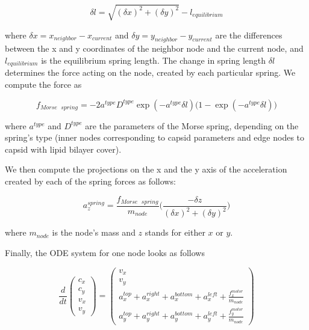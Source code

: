 \begin{equation}
\delta l = \sqrt{(\delta x)^2 + (\delta y)^2} - l_{equilibrium}
\end{equation}

where $\delta x = x_{neighbor} - x_{current}$ and $\delta y = y_{neighbor} - y_{current}$ are the differences between the x and y coordinates of the neighbor node and the current node, and $l_{equilibrium}$ is the equilibrium spring length. The change in spring length $\delta l$ determines the force acting on the node, created by each particular spring. We compute the force as

\begin{equation}
f_{Morse\text{ }spring} = -2 a^{type} D^{type} \exp(-a^{type} \delta l) \big(1 - \exp(-a^{type} \delta l)\big)
\end{equation}
 
where $a^{type}$ and $D^{type}$ are the parameters of the Morse spring, depending on the spring’s type (inner nodes corresponding to capsid parameters and edge nodes to capsid with lipid bilayer cover).

We then compute the projections on the x and the y axis of the acceleration created by each of the spring forces as follows:

\begin{equation}
a^{spring}_z = \frac{f_{Morse\text{ }spring}}{m_{node}} \Big(\frac{-\delta z}{(\delta x)^2 + (\delta y)^2}\Big)
\end{equation}

where $m_{node}$ is the node’s mass and $z$ stands for either $x$ or $y$.

Finally, the ODE system for one node looks as follows

\begin{equation}
\frac{d}{dt}
\begin{pmatrix}
c_x\\
c_y\\
v_x\\
v_y
\end{pmatrix}
=
\begin{pmatrix}
v_x\\
v_y\\
a^{top}_x + a^{right}_x + a^{bottom}_x + a^{left}_x + \frac{f^{motor}_x}{m_{node}}\\
a^{top}_y + a^{right}_y + a^{bottom}_y + a^{left}_y + \frac{f^{motor}_y}{m_{node}}
\end{pmatrix}
\end{equation}

